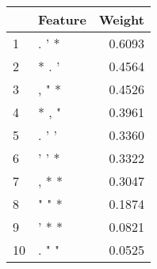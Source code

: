 \begin{tabular}{llr}
\toprule
{} & Feature &  Weight \\
\midrule
1  &   . ' * &  0.6093 \\
2  &   * . ' &  0.4564 \\
3  &   , " * &  0.4526 \\
4  &   * , " &  0.3961 \\
5  &   . ' ' &  0.3360 \\
6  &   ' ' * &  0.3322 \\
7  &   , * * &  0.3047 \\
8  &   " " * &  0.1874 \\
9  &   ' * * &  0.0821 \\
10 &   . " " &  0.0525 \\
\bottomrule
\end{tabular}
